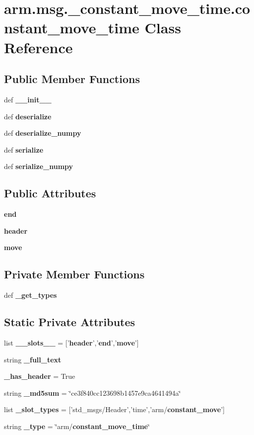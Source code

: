 \section{arm.\-msg.\-\_\-constant\-\_\-move\-\_\-time.\-constant\-\_\-move\-\_\-time \-Class \-Reference}
\label{classarm_1_1msg_1_1__constant__move__time_1_1constant__move__time}
\subsection*{\-Public \-Member \-Functions}
\begin{DoxyCompactItemize}
\item 
def {\bf \-\_\-\-\_\-init\-\_\-\-\_\-}
\item 
def {\bf deserialize}
\item 
def {\bf deserialize\-\_\-numpy}
\item 
def {\bf serialize}
\item 
def {\bf serialize\-\_\-numpy}
\end{DoxyCompactItemize}
\subsection*{\-Public \-Attributes}
\begin{DoxyCompactItemize}
\item 
{\bf end}
\item 
{\bf header}
\item 
{\bf move}
\end{DoxyCompactItemize}
\subsection*{\-Private \-Member \-Functions}
\begin{DoxyCompactItemize}
\item 
def {\bf \-\_\-get\-\_\-types}
\end{DoxyCompactItemize}
\subsection*{\-Static \-Private \-Attributes}
\begin{DoxyCompactItemize}
\item 
list {\bf \-\_\-\-\_\-slots\-\_\-\-\_\-} = ['{\bf header}','{\bf end}','{\bf move}']
\item 
string {\bf \-\_\-full\-\_\-text}
\item 
{\bf \-\_\-has\-\_\-header} = \-True
\item 
string {\bf \-\_\-md5sum} = \char`\"{}ce3f840cc123698b1457e9ca4641494a\char`\"{}
\item 
list {\bf \-\_\-slot\-\_\-types} = ['std\-\_\-msgs/\-Header','time','arm/{\bf constant\-\_\-move}']
\item 
string {\bf \-\_\-type} = \char`\"{}arm/{\bf constant\-\_\-move\-\_\-time}\char`\"{}
\end{DoxyCompactItemize}


